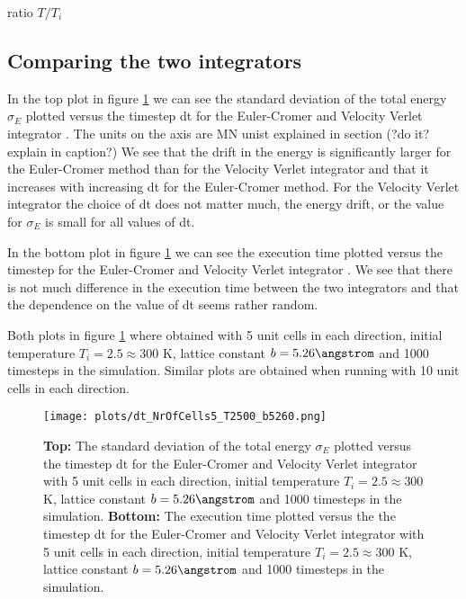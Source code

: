 \documentclass[11pt,a4wide]{article}
\begin{document}
ratio $T/T_i$


\subsection{Comparing the two integrators}

In the top plot in figure \ref{fig: dt} we can see the standard deviation of the total energy $\sigma_E$ plotted versus the timestep dt for the Euler-Cromer and Velocity Verlet integrator . The units on the axis are MN unist explained in section (?do it? explain in caption?) We see that the drift in the energy is significantly larger for the Euler-Cromer method than for the Velocity Verlet integrator and that it increases with increasing dt for the Euler-Cromer method. For the Velocity Verlet integrator the choice of dt does not matter much, the energy drift, or the value for $\sigma_E$ is small for all values of dt. 

In the bottom plot in figure \ref{fig: dt} we can see the execution time plotted versus the timestep for the Euler-Cromer and Velocity Verlet integrator . We see that there is not much difference in the execution time between the two integrators and that the dependence on the value of dt seems rather random. 

Both plots in figure \ref{fig: dt} where obtained with 5 unit cells in each direction, initial temperature $T_i = 2.5 \approx 300$ K, lattice constant $b=5.26 \angstrom$ and 1000 timesteps in the simulation. Similar plots are obtained when running with 10 unit cells in each direction. 

\begin{figure}[htp]
\centering
\texttt{[image: plots/dt\_NrOfCells5\_T2500\_b5260.png]}
\caption{\textbf{Top:} The standard deviation of the total energy $\sigma_E$ plotted versus the timestep dt for the Euler-Cromer and Velocity Verlet integrator with 5 unit cells in each direction, initial temperature $T_i = 2.5 \approx 300$ K, lattice constant $b=5.26 \angstrom$ and 1000 timesteps in the simulation. \textbf{Bottom:} The execution time plotted versus the the timestep dt for the Euler-Cromer and Velocity Verlet integrator with 5 unit cells in each direction, initial temperature $T_i = 2.5 \approx 300$ K, lattice constant $b=5.26 \angstrom$ and 1000 timesteps in the simulation.}
\label{fig: dt}
\end{figure}
\end{document}
